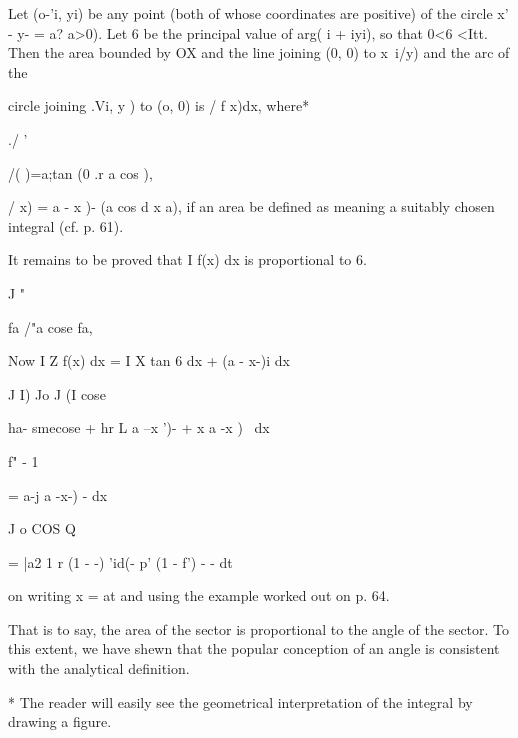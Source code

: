 %
%

Let (o-'i, yi) be any point (both of whose coordinates are positive)
of the circle x' - y- = a? a>0). Let 6 be the principal value of arg(
i + iyi), so that 0<6 <Itt. Then the area bounded by OX and the line
joining (0, 0) to x\, i/y) and the arc of the

circle joining .Vi, y ) to (o, 0) is / f x)dx, where*

./ '

/( )=a;tan (0 .r a cos ),

/ x) = a - x )- (a cos d x a), if an area be defined as meaning a
suitably chosen integral (cf. p. 61).

It remains to be proved that I f(x) dx is proportional to 6.

J "

fa /"a cose fa,

Now I Z f(x) dx = I X tan 6 dx + (a - x-)i dx

J I) Jo J (I cose

 ha- smecose + hr L a --x ')- + x a -x ) \ dx

f" - 1

= a-j a -x-) - dx

J o COS Q

= |a2 1 r (1 - -) 'id(- p' (1 - f') - - dt\

on writing x = at and using the example worked out on p. 64.

That is to say, the area of the sector is proportional to the angle of
the sector. To this extent, we have shewn that the popular conception
of an angle is consistent with the analytical definition.

* The reader will easily see the geometrical interpretation of the
integral by drawing a figure.